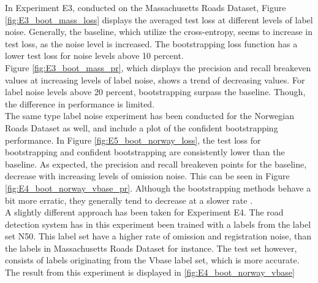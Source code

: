 In Experiment E3, conducted on the Massachusetts Roads Dataset, Figure \ref{fig:E3_boot_mass_loss} displays the averaged test loss at different levels of label noise. Generally, the baseline, which utilize the cross-entropy, seems to increase in test loss, as the noise level is increased. The bootstrapping loss function has a lower test loss for noise levels above 10 percent.\\

Figure \ref{fig:E3_boot_mass_pr}, which displays the precision and recall breakeven values at increasing levels of label noise, shows a trend of decreasing values. For label noise levels above 20 percent, bootstrapping surpass the baseline. Though, the difference in performance is limited.\\

The same type label noise experiment has been conducted for the Norwegian Roads Dataset as well, and include a plot of the confident bootstrapping performance. In Figure \ref{fig:E5_boot_norway_loss}, the test loss for bootstrapping and confident bootstrapping are consistently lower than the baseline. As expected, the precision and recall breakeven points for the baseline, decrease with increasing levels of omission noise. This can be seen in Figure \ref{fig:E4_boot_norway_vbase_pr}. Although the bootstrapping methods behave a bit more erratic, they generally tend to decrease at a slower rate .\\

A slightly different approach has been taken for Experiment E4. The road detection system has in this experiment been trained with a labels from the label set N50. This label set have a higher rate of omission and registration noise, than the labels in Massachusetts Roads Dataset for instance. The test set however, consists of labels originating from the Vbase label set, which is more accurate. The result from this experiment is displayed in \ref{fig:E4_boot_norway_vbase}\\



